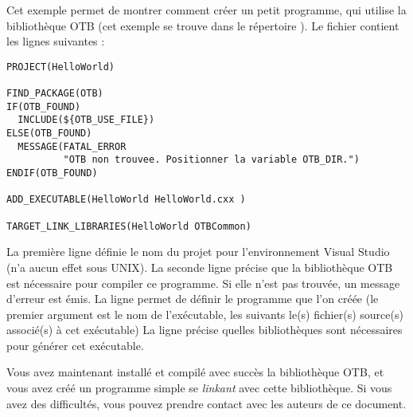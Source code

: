 
Cet exemple permet de montrer comment cr\'{e}er un petit programme, qui utilise la biblioth\`{e}que OTB 
(cet exemple se trouve dans le r\'{e}pertoire ).
Le fichier  contient les lignes suivantes :

\small
\begin{verbatim}
PROJECT(HelloWorld)

FIND_PACKAGE(OTB)
IF(OTB_FOUND)
  INCLUDE(${OTB_USE_FILE})
ELSE(OTB_FOUND)
  MESSAGE(FATAL_ERROR
          "OTB non trouvee. Positionner la variable OTB_DIR.")
ENDIF(OTB_FOUND)

ADD_EXECUTABLE(HelloWorld HelloWorld.cxx )

TARGET_LINK_LIBRARIES(HelloWorld OTBCommon)
\end{verbatim}
\normalsize

La premi\`{e}re ligne d\'{e}finie le nom du projet pour l'environnement Visual Studio (n'a aucun effet sous UNIX).
 La seconde ligne pr\'{e}cise que la biblioth\`{e}que OTB est n\'{e}cessaire pour compiler ce programme. 
Si elle n'est pas trouv\'{e}e, un message d'erreur est \'{e}mis.
La ligne  permet de d\'{e}finir le programme que l'on cr\'{e}\'{e}e 
(le premier argument est le nom de l'ex\'{e}cutable, les suivants le(s) fichier(s) source(s) associ\'{e}(s) \`{a} cet ex\'{e}cutable)
La ligne  pr\'{e}cise quelles biblioth\`{e}ques sont n\'{e}cessaires pour g\'{e}n\'{e}rer cet ex\'{e}cutable.



Vous avez maintenant install\'{e} et compil\'{e} avec succ\`{e}s la biblioth\`{e}que OTB, et vous avez cr\'{e}\'{e} un programme simple se \emph{linkant} avec cette biblioth\`{e}que.
Si vous avez des difficult\'{e}s, vous pouvez prendre contact avec les auteurs de ce document.

